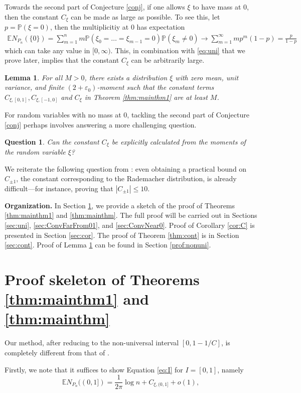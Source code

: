\documentclass[12pt, reqno]{amsart}
\theoremstyle{plain}
\newtheorem{lemma}[theorem]{Lemma}
\newtheorem{question}[theorem]{Question}
\theoremstyle{definition}
\renewcommand\P{{\mathbb{P}}}
\newcommand\E{{\mathbb{E}}}
\newcommand{\ep}{\varepsilon}
\begin{document}
 Towards the second part of Conjecture \ref{conj}, if one allows $\xi$ to have mass at 0, then the constant $C_{\xi}$ can be made as large as possible. To see this, let $p=\P(\xi=0)$, then the multiplicitiy at $0$ has expectation
 \begin{eqnarray}
 	\E N_{P_n}(\{0\}) = \sum_{m=1}^{n} m \P(\xi_0=\dots =\xi_{m-1}=0) \P(\xi_{m}\neq 0)\to \sum_{m=1}^{\infty} m p^{m} (1-p) =\frac{p}{1-p}\label{eq:0}
 \end{eqnarray}
 which can take any value in $[0, \infty)$. This, in combination with \eqref{eq:uni} that we prove later, implies that the constant $C_{\xi}$ can be arbitrarily large.
 \begin{lemma}\label{lm:nonUniversality}
 	For all $M > 0$, there exists a distribution $\xi$ with zero mean, unit variance, and finite $(2 + \ep_0)$-moment such that the constant terms $C_{\xi, [0, 1]}, C_{\xi, [-1, 0]}$ and $C_{\xi}$ in Theorem \ref{thm:mainthm1} are at least $M$.
 \end{lemma}
For random variables with no mass at 0, tackling the second part of Conjecture \ref{conj} perhaps involves answering a more challenging question.
 \begin{question}
 	Can the constant $C_{\xi}$ be explicitly calculated from the moments of the random variable $\xi$?
 \end{question}
 We reiterate the following question from \cite{DoHoiNguyenVu}: even obtaining a practical bound on $C_{\pm 1}$, the constant corresponding to the Rademacher distribution, is already difficult—for instance, proving that $|C_{\pm 1}|\le 10$.


{\bf Organization.} In Section \ref{sec:sketch}, we provide a sketch of the proof of Theorems \ref{thm:mainthm1} and \ref{thm:mainthm}. The full proof will be carried out in Sections \ref{sec:uni}, \ref{sec:ConvFarFrom01}, and \ref{sec:ConvNear0}. 
Proof of Corollary \ref{cor:C} is presented in Section \ref{sec:cor}.
The proof of Theorem \ref{thm:cont} is in Section \ref{sec:cont}. Proof of Lemma \ref{lm:nonUniversality} can be found in Section \ref{prof:nonuni}.
\section{Proof skeleton of Theorems \ref{thm:mainthm1} and \ref{thm:mainthm}}\label{sec:sketch}
 Our method, after reducing to the non-universal interval $[0, 1-1/C]$, is completely different from that of \cite{DoHoiNguyenVu}. 
 
Firstly, we note that it suffices to show Equation \eqref{eq:I} for $I=[0, 1]$, namely
 \begin{equation}
 	\E N_{P_n}((0, 1]) = \dfrac{1}{2\pi}\log n + C_{\xi, (0, 1]} + o(1), \label{eq:01}
 \end{equation}
 
\end{document}
